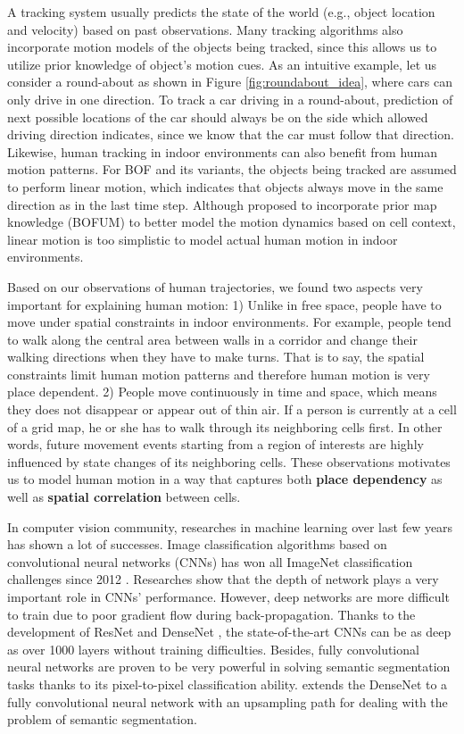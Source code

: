 A tracking system usually predicts the state of the world (e.g., object location and velocity) based on past observations. Many tracking algorithms also incorporate motion models of the objects being tracked, since this allows us to utilize prior knowledge of object's motion cues. As an intuitive example, let us consider a round-about as shown in Figure \ref{fig:roundabout_idea}, where cars can only drive in one direction. To track a car driving in a round-about, prediction of next possible locations of the car should always be on the side which allowed driving direction indicates, since we know that the car must follow that direction. Likewise, human tracking in indoor environments can also benefit from human motion patterns. For BOF and its variants, the objects being tracked are assumed to perform linear motion, which indicates that objects always move in the same direction as in the last time step. Although \citet{gindele2009bayesian} proposed to incorporate prior map knowledge (BOFUM) to better model the motion dynamics based on cell context, linear motion is too simplistic to model actual human motion in indoor environments. 

Based on our observations of human trajectories, we found two aspects very important for explaining human motion: 1) Unlike in free space, people have to move under spatial constraints in indoor environments. For example, people tend to walk along the central area between walls in a corridor and change their walking directions when they have to make turns. That is to say, the spatial constraints limit human motion patterns and therefore human motion is very place dependent. 2) People move continuously in time and space, which means they does not disappear or appear out of thin air. If a person is currently at a cell of a grid map, he or she has to walk through its neighboring cells first. In other words, future movement events starting from a region of interests are highly influenced by state changes of its neighboring cells. These observations motivates us to model human motion in a way that captures both \textbf{place dependency} as well as \textbf{spatial correlation} between cells.

In computer vision community, researches in machine learning over last few years has shown a lot of successes. Image classification algorithms based on convolutional neural networks (CNNs) has won all ImageNet classification challenges since 2012 \citep{russakovsky2015imagenet}. Researches show that the depth of network plays a very important role in CNNs' performance. However, deep networks are more difficult to train due to poor gradient flow during back-propagation. Thanks to the development of ResNet \citep{he2016deep} and DenseNet \citep{huang2016densely}, the state-of-the-art CNNs can be as deep as over 1000 layers without training difficulties. Besides, fully convolutional neural networks \citep{long2015fully} are proven to be very powerful in solving semantic segmentation tasks thanks to its pixel-to-pixel classification ability. \citet{jegou2017one} extends the DenseNet to a fully convolutional neural network with an upsampling path for dealing with the problem of semantic segmentation. 

